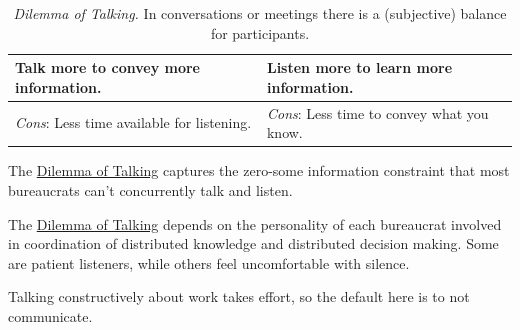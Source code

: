 \begin{center}
\begin{table}[H] %
\begin{tabular}{ | m{\dilemmatablewidth}| m{\dilemmatablewidth} | } 
  \hline
  \textbf{Talk more to convey more information.} & 
  \textbf{Listen more to learn more information.} \\ 
  \hline
  \textit{Cons}: Less time available for listening. & 
  \textit{Cons}: Less time to convey what you know. \\  
  \hline
\end{tabular}
\caption{
\textit{Dilemma of Talking.}
In conversations or meetings there is a (subjective) balance for participants.
}
\label{table:dilemma-personal-talk-or-listen}
\end{table}
\end{center}

The \hyperref[table:dilemma-personal-talk-or-listen]{Dilemma of Talking} captures the zero-some information constraint that most bureaucrats can't concurrently talk and listen. 

The \hyperref[table:dilemma-personal-talk-or-listen]{Dilemma of Talking} depends on the personality of each bureaucrat involved in coordination of distributed knowledge and distributed decision making. Some are patient listeners, while others feel uncomfortable with silence.

Talking constructively about work takes effort, so the default here is to not communicate. 


